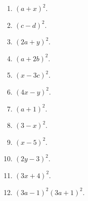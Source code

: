 \documentclass{book}
\begin{document}
\begin{enumerate}

\item $(a + x)^2$.

\item $(c - d)^2$.

\item $(2a + y)^2$.

\item $(a + 2b)^2$.

\item $(x - 3c)^2$.

\item $(4x - y)^2$.

\item $(a + 1)^2$.

\item $(3 - x)^2$.

\item $(x - 5)^2$.

\item $(2y - 3)^2$.

\item $(3x + 4)^2$.

\item $(3a - 1)^2(3a + 1)^2$.


\end{enumerate}
\end{document}
